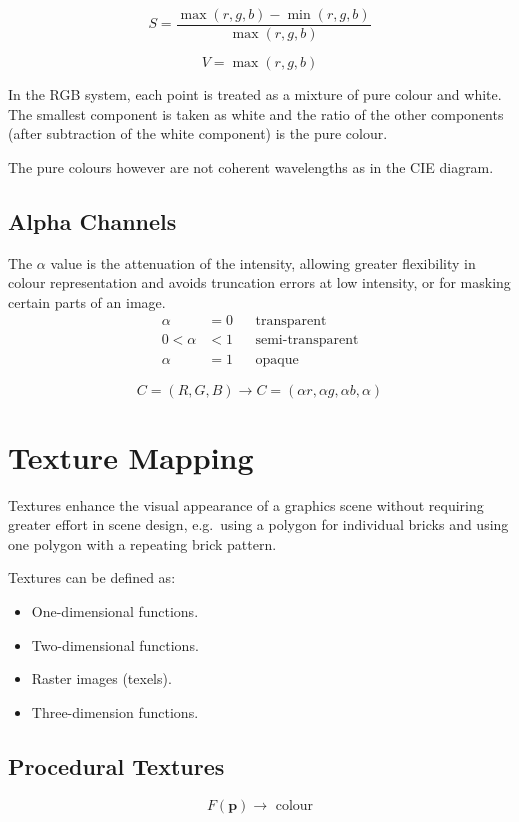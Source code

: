 \documentclass[11pt]{article}
\begin{document}
\[
  S = \frac{\max(r,g,b) - \min(r, g, b)}{\max(r, g, b)} 
\]

\[
  V = \max(r, g, b) 
\]

In the RGB system, each point is treated as a mixture of pure colour and white.
The smallest component is taken as white and the ratio of the other components (after subtraction of the white component) is the pure colour.

The pure colours however are not coherent wavelengths as in the CIE diagram.

\subsection{Alpha Channels}
The $\alpha$ value is the attenuation of the intensity, allowing greater flexibility in colour representation and avoids truncation errors at low intensity, or for masking certain parts of an image.
\begin{align*}
  \alpha &= 0 && \text{transparent} \\
  0 < \alpha &< 1 && \text{semi-transparent} \\
  \alpha &= 1 && \text{opaque}
\end{align*}

\[
  C = (R, G, B) \rightarrow C = (\alpha r, \alpha g, \alpha b, \alpha) 
\]

\section{Texture Mapping}
Textures enhance the visual appearance of a graphics scene without requiring greater effort in scene design, e.g.\ using a polygon for individual bricks and using one polygon with a repeating brick pattern.

Textures can be defined as:
\begin{itemize}
  \item One-dimensional functions.
  \item Two-dimensional functions.
  \item Raster images (texels).
  \item Three-dimension functions.
\end{itemize}

\subsection{Procedural Textures}
\[
  F(\textbf{p}) \rightarrow \text{ colour} 
\]
\end{document}
